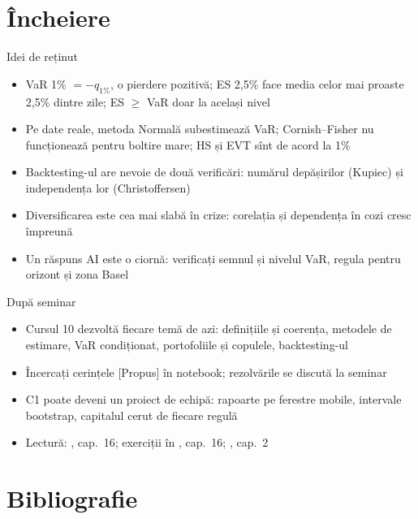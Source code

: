 \section{Încheiere}

\begin{frame}{Idei de reținut}
\itemsize{\small}
\begin{itemize}
    \item VaR 1\% $= -q_{1\%}$, o pierdere pozitivă; ES 2,5\% face media celor mai proaste 2,5\% dintre zile; ES $\ge$ VaR doar la același nivel
    \item Pe date reale, metoda Normală subestimează VaR; Cornish--Fisher nu funcționează pentru boltire mare; HS și EVT sînt de acord la 1\%
    \item Backtesting-ul are nevoie de două verificări: numărul depășirilor (Kupiec) și independența lor (Christoffersen)
    \item Diversificarea este cea mai slabă în crize: corelația și dependența în cozi cresc împreună
    \item Un răspuns AI este o ciornă: verificați semnul și nivelul VaR, regula pentru orizont și zona Basel
\end{itemize}
\end{frame}

\begin{frame}{După seminar}
\itemsize{\small}
\begin{itemize}
    \item Cursul 10 dezvoltă fiecare temă de azi: definițiile și coerența, metodele de estimare, VaR condiționat, portofoliile și copulele, backtesting-ul
    \item Încercați cerințele [Propus] în notebook; rezolvările se discută la seminar
    \item C1 poate deveni un proiect de echipă: rapoarte pe ferestre mobile, intervale bootstrap, capitalul cerut de fiecare regulă
    \item Lectură: , cap.~16; exerciții în , cap.~16; , cap.~2
\end{itemize}
\end{frame}


\section{Bibliografie}

